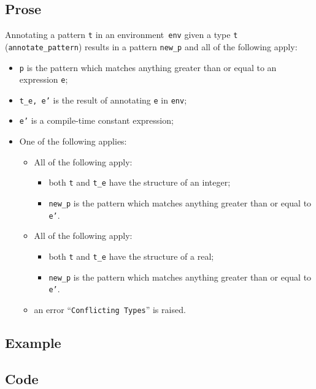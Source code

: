 \documentclass{book}
\begin{document}
  \subsection{Prose}
   Annotating a pattern \texttt{t} in an environment~\texttt{env} given a type \texttt{t} (\texttt{annotate\_pattern}) results in a pattern \texttt{new\_p} and all of the following apply:
   \begin{itemize}
   \item \texttt{p} is the pattern which matches anything greater than or equal to an expression \texttt{e};
   \item \texttt{t\_e, e'} is the result of annotating \texttt{e} in \texttt{env};
   \item \texttt{e'} is a compile-time constant expression;
   \item One of the following applies:
     \begin{itemize}
     \item All of the following apply:
           \begin{itemize}
           \item both \texttt{t} and \texttt{t\_e} have the structure of an integer;
           \item \texttt{new\_p} is the pattern which matches anything greater than or equal to \texttt{e'}.
           \end{itemize}
     \item All of the following apply:
           \begin{itemize}
           \item both \texttt{t} and \texttt{t\_e} have the structure of a real;
           \item \texttt{new\_p} is the pattern which matches anything greater than or equal to \texttt{e'}.
           \end{itemize}
     \item an error ``\texttt{Conflicting Types}'' is raised.
     \end{itemize}
   \end{itemize}

  \subsection{Example}

  \subsection{Code}
\end{document}

